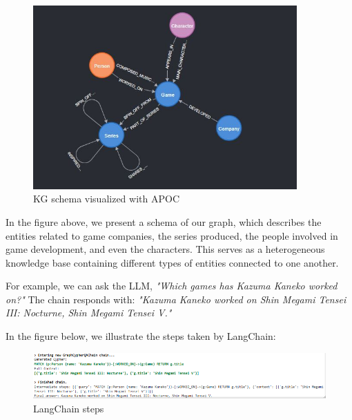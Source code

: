 \begin{figure}[h]
    \centering
    \includegraphics[width=0.9\textwidth]{IMAGES/Schema.JPG}
    \caption{KG schema visualized with APOC}
    \label{fig:Matching Nodes}
\end{figure}

In the figure above, we present a schema of our graph, which describes the entities related to game companies, the series produced, the people involved in game development, and even the characters. This serves as a heterogeneous knowledge base containing different types of entities connected to one another. 

For example, we can ask the LLM, \textit{"Which games has Kazuma Kaneko worked on?"} The chain responds with: \textit{"Kazuma Kaneko worked on Shin Megami Tensei III: Nocturne, Shin Megami Tensei V."} 


In the figure below, we illustrate the steps taken by LangChain:
\begin{figure}[h]
    \centering
    \includegraphics[width=1.1\textwidth]{IMAGES/immagine_2025-03-31_122504590.png}
    \caption{LangChain steps}
    \label{fig:Matching Nodes}
\end{figure}

